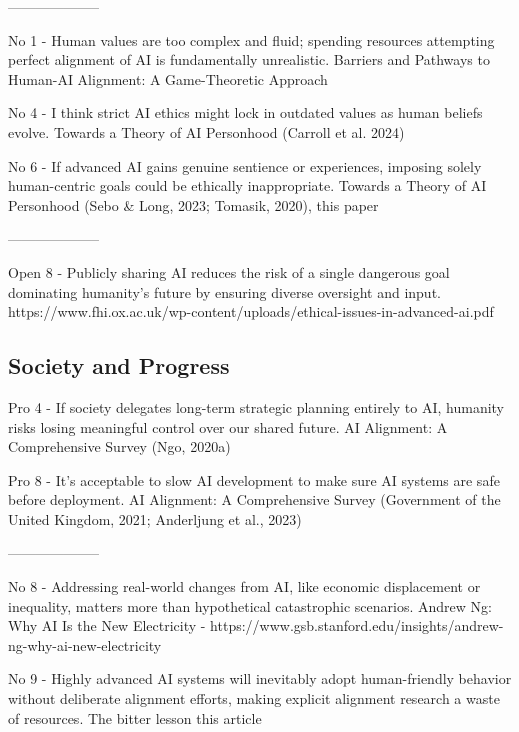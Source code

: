 --------------------

No 1 - Human values are too complex and fluid; spending resources attempting perfect alignment of AI is fundamentally unrealistic.
Barriers and Pathways to Human-AI Alignment: A Game-Theoretic Approach
\citep{nayebi_barriers_2025}

No 4 - I think strict AI ethics might lock in outdated values as human beliefs evolve.
Towards a Theory of AI Personhood
(Carroll et al. 2024)
\citep{carroll_ai_2024}

No 6 - If advanced AI gains genuine sentience or experiences, imposing solely human-centric goals could be ethically inappropriate.
Towards a Theory of AI Personhood
(Sebo \& Long, 2023; Tomasik, 2020), this paper
\citep{sebo_moral_2025}
\citep{tomasik_dialogue_2015}
\citep{ward_towards_2025}

--------------------

Open 8 - Publicly sharing AI reduces the risk of a single dangerous goal dominating humanity’s future by ensuring diverse oversight and input.
https://www.fhi.ox.ac.uk/wp-content/uploads/ethical-issues-in-advanced-ai.pdf
\citep{wallach_ethical_2020}

\subsection{Society and Progress}

Pro 4 - If society delegates long-term strategic planning entirely to AI, humanity risks losing meaningful control over our shared future.
AI Alignment: A Comprehensive Survey
(Ngo, 2020a)
\citep{ngo_agi_2020}

Pro 8 - It's acceptable to slow AI development to make sure AI systems are safe before deployment.
AI Alignment: A Comprehensive Survey
(Government of the United Kingdom, 2021; Anderljung et al., 2023)
\citep{government_of_the_united_kingdom_roadmap_2021}
\citep{anderljung_frontier_2023}

--------------------

No 8 - Addressing real-world changes from AI, like economic displacement or inequality, matters more than hypothetical catastrophic scenarios.
Andrew Ng: Why AI Is the New Electricity - https://www.gsb.stanford.edu/insights/andrew-ng-why-ai-new-electricity
\citep{ng_andrew_2017}

No 9 - Highly advanced AI systems will inevitably adopt human-friendly behavior without deliberate alignment efforts, making explicit alignment research a waste of resources.
The bitter lesson
this article
\citep{sutton_bitter_2019}

